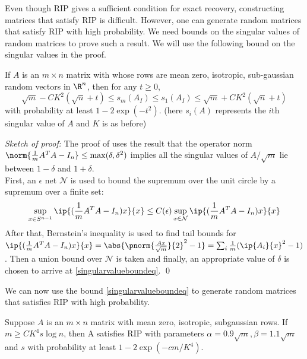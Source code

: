 Even though RIP gives a sufficient condition for exact
recovery, constructing matrices that satisfy RIP is difficult.
However, one can generate random matrices that satisfy RIP
with high probability. We need bounds on the singular values
of random matrices to prove such a result. We will use
the following bound on the singular values in the proof.
\begin{theorem}\label{singularvaluebounds}
	If $A$ is an $m\times n$ matrix with whose rows are mean zero,
	isotropic, sub-gaussian random vectors in $\R^n$, then for any
	$t\geq 0$,
	\begin{equation}\label{singularvalueboundeq}
		\sqrt{m} - CK^2(\sqrt{n}+t)\leq s_m(A_I)\leq s_1(A_I)
			\leq \sqrt{m} + CK^2(\sqrt{n}+t)
	\end{equation}
	with probability at least $1-2\exp(-t^2)$. (here $s_i(A)$
	represents the $i$th singular value of $A$ and $K$ is as before)
\end{theorem}
\noindent
\textit{Sketch of proof: }
The proof of uses the result that the operator norm
$\norm{\frac{1}{m}A^TA - I_n}\leq \max(\delta, \delta^2)$ implies
all the singular values of $A/\sqrt{m}$
lie between $1-\delta$ and $1+\delta$.\\
First, an $\epsilon$ net $\mathcal{N}$ is used to bound
the supremum over the unit circle by a supremum over a
finite set:
$$\sup_{x\in S^{n-1}}\ip{(\frac{1}{m}A^TA-I_n)x}{x}\leq 
C(\epsilon)\sup_{x\in\mathcal{N}}\ip{(\frac{1}{m}A^TA-I_n)x}{x}$$
After that, Bernstein's inequality is used to find tail bounds
for ${\ip{(\frac{1}{m}A^TA-I_n)x}{x}} = 
\abs{\pnorm{\frac{Ax}{\sqrt{m}}}{2}^2 - 1} = 
\sum_i \frac{1}{m}(\ip{A_i}{x}^2-1)$.
Then a union bound over $\mathcal{N}$ is taken
and finally, an appropriate value of $\delta$ is chosen
to arrive at \eqref{singularvalueboundeq}.
\indent
\qed

We can now use the bound \eqref{singularvalueboundeq} to
generate random matrices that satisfies RIP with high probability.

\begin{theorem}\label{randomripprop}
	Suppose $A$ is an $m\times n$ matrix with mean zero, isotropic,
	subgaussian rows. If $m\geq CK^4 s\log n$, then
	A satisfies RIP with parameters $\alpha = 0.9\sqrt{m}, \beta = 1.1\sqrt{m}$ and
	$s$ with probability at least $1-2\exp({-cm}/{K^4})$.
\end{theorem}

